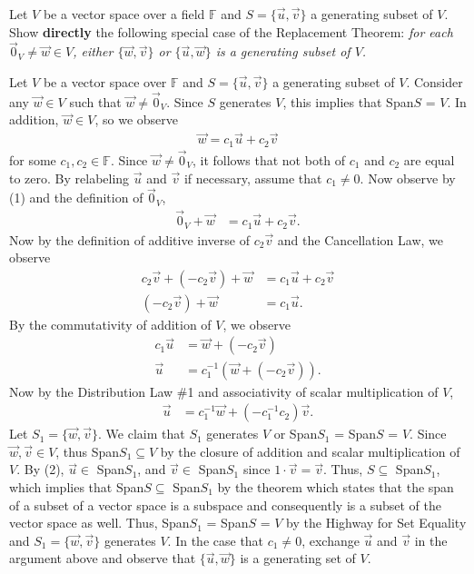 \documentclass[12pt,answers]{exam}
\newcommand{\F}{\mathbb{F}}
\newenvironment{problem}[2][Problem]{\begin{trivlist}
\item[\hskip \labelsep {\bfseries #1}\hskip \labelsep {\bfseries #2.}]}{\end{trivlist}}
\begin{document}
\begin{problem}{3}
Let $V$ be a vector space over a field $\mathbb{F}$ and $S=\{\vec{u},\vec{v}\}$ a generating subset of $V$. Show \textbf{directly} the following special case of the Replacement Theorem: \textit{for each $\vec{0}_V\neq \vec{w}\in V$, either $\{\vec{w},\vec{v}\}$ or $\{\vec{u},\vec{w}\}$ is a generating subset of $V$.}
\end{problem}
\begin{solution}
Let $V$ be a vector space over $\mathbb{F}$ and $S=\{\vec{u},\vec{v}\}$ a generating subset of $V$. Consider any $\vec{w}\in V$ such that $\vec{w}\neq \vec{0}_V$. Since $S$ generates $V$, this implies that Span$S$ = $V$. In addition, $\vec{w}\in V$, so we observe
\begin{align}
	\vec{w}=c_{1}\vec{u}+c_2\vec{v}
\end{align}
for some $c_{1},c_{2}\in \F$. Since $\vec{w}\neq \vec{0}_V$, it follows that not both of $c_{1}$ and $c_{2}$ are equal to zero. By relabeling $\vec{u}$ and $\vec{v}$ if necessary, assume that $c_{1}\neq 0$. Now observe by (1) and the definition of $\vec{0}_V$,
\begin{align*}
	\vec{0}_V+\vec{w}&=c_{1}\vec{u}+c_2\vec{v}.
\end{align*} Now by the definition of additive inverse of $c_2\vec{v}$ and the Cancellation Law, we observe
\begin{align*}
	c_2\vec{v}+(-c_2\vec{v})+\vec{w}&=c_{1}\vec{u}+c_2\vec{v} \\
	(-c_2\vec{v})+\vec{w}&=c_{1}\vec{u}.
\end{align*} By the commutativity of addition of $V$, we observe
\begin{align*}
	c_{1}\vec{u}&=\vec{w}+(-c_2\vec{v}) \\
	\vec{u}&=c^{-1}_{1}(\vec{w}+(-c_2\vec{v})).
\end{align*} Now by the Distribution Law \#1 and associativity of scalar multiplication of $V$,
\begin{align}
	\vec{u}&=c^{-1}_{1}\vec{w}+(-c^{-1}_{1}c_2)\vec{v}.
\end{align} Let $S_1=\{\vec{w},\vec{v}\}$. We claim that $S_1$ generates $V$ or Span$S_1$ = Span$S$ = $V$. Since $\vec{w},\vec{v}\in V$, thus Span$S_1\subseteq V$ by the closure of addition and scalar multiplication of $V$. By (2), $\vec{u}\in$ Span$S_{1}$, and $\vec{v}\in$ Span$S_{1}$ since $1\cdot \vec{v}=\vec{v}$. Thus, $S\subseteq$ Span$S_1$, which implies that Span$S\subseteq$ Span$S_{1}$ by the theorem which states that the span of a subset of a vector space is a subspace and consequently is a subset of the vector space as well. Thus, Span$S_1$ = Span$S$ = $V$ by the Highway for Set Equality and $S_1=\{\vec{w},\vec{v}\}$ generates $V$. In the case that $c_1\neq0$, exchange $\vec{u}$ and $\vec{v}$ in the argument above and observe that $\{\vec{u},\vec{w}\}$ is a generating set of $V$. 
	




















\end{solution}
\end{document}
